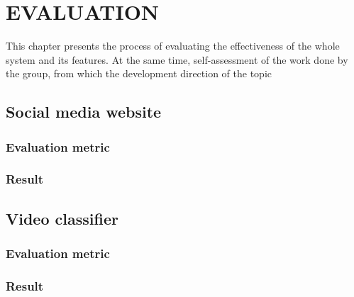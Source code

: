 \chapter{EVALUATION}
This chapter presents the process of evaluating the effectiveness of the whole system and its features. At the same time, self-assessment of the work done by the group, from which the development direction of the topic
\section{Social media website}
\subsection{Evaluation metric}
\subsection{Result}
\section{Video classifier}
\subsection{Evaluation metric}
\subsection{Result}


